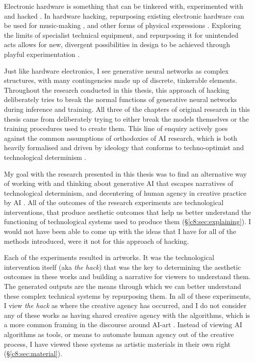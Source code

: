 Electronic hardware is something that can be tinkered with, experimented with and hacked \citep{collins2004hardware, grand2004hardware}. 
In hardware hacking, repurposing existing electronic hardware can be used for music-making \citep{collins2009handmade}, and other forms of physical expressions \citep{hartmann2008hacking}.
Exploring the limits of specialist technical equipment, and repurposing it for unintended acts allows for new, divergent possibilities in design to be achieved through playful experimentation \citep{goddard2015playful}.

Just like hardware electronics, I see generative neural networks as complex structures, with many contingencies made up of discrete, tinkerable elements.
Throughout the research conducted in this thesis, this approach of hacking deliberately tries to break the normal functions of generative neural networks during inference and training. 
All three of the chapters of original research in this thesis came from deliberately trying to either break the models themselves or the training procedures used to create them.
This line of enquiry actively goes against the common assumptions of orthodoxies of AI research, which is both heavily formalised and driven by ideology \citep{sias2021ideology} that conforms to techno-optimist \citep{andreesen2023techno} and technological determinism \citep{drew2016technological}. 

My goal with the research presented in this thesis was to find an alternative way of working with and thinking about generative AI that escapes narratives of technological determinism, and decentering of human agency in creative practice by AI \citep{zeilinger2021tactical}.
All of the outcomes of the research experiments are technological interventions, that produce aesthetic outcomes that help us better understand the functioning of technological systems used to produce them (\S \ref{c8:sec:explaining}). 
I would not have been able to come up with the ideas that I have for all of the methods introduced, were it not for this approach of hacking.

Each of the experiments resulted in artworks.
It was the technological intervention itself (aka \textit{the hack}) that was the key to determining the aesthetic outcomes in these works and building a narrative for viewers to understand them.
The generated outputs are the means through which we can better understand these complex technical systems by repurposing them.
In all of these experiments, I view \textit{the hack} as where the creative agency has occurred, and I do not consider any of these works as having shared creative agency with the algorithms, which is a more common framing in the discourse around AI-art \citep{moruzzi2022creative}.
Instead of viewing AI algorithms as tools, or means to automate human agency out of the creative process, I have viewed these systems as artistic materials in their own right (\S \ref{c8:sec:material}).

